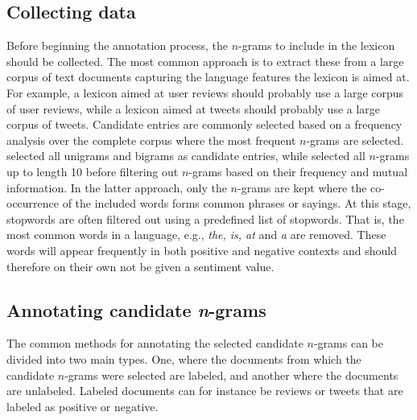 \subsection{Collecting data}
Before beginning the annotation process, the $n$-grams to include in the lexicon should be collected. The most common approach is to extract these from a large corpus of text documents capturing the language features the lexicon is aimed at. For example, a lexicon aimed at user reviews should probably use a large corpus of user reviews, while a lexicon aimed at tweets should probably use a large corpus of tweets. Candidate entries are commonly selected based on a frequency analysis over the complete corpus where the most frequent $n$-grams are selected. \cite{MohammadKZ2013} selected all unigrams and bigrams as candidate entries, while \cite{Velikovich2010} selected all $n$-grams up to length 10 before filtering out $n$-grams based on their frequency and mutual information. In the latter approach, only the $n$-grams are kept where the co-occurrence of the included words forms common phrases or sayings. At this stage, stopwords are often filtered out using a predefined list of stopwords. That is, the most common words in a language, e.g., \textit{the, is, at} and \textit{a} are removed. These words will appear frequently in both positive and negative contexts and should therefore on their own not be given a sentiment value.


\subsection{Annotating candidate \textit{n}-grams}
The common methods for annotating the selected candidate $n$-grams can be divided into two main types. One, where the documents from which the candidate $n$-grams were selected are labeled, and another where the documents are unlabeled. Labeled documents can for instance be reviews or tweets that are labeled as positive or negative.


